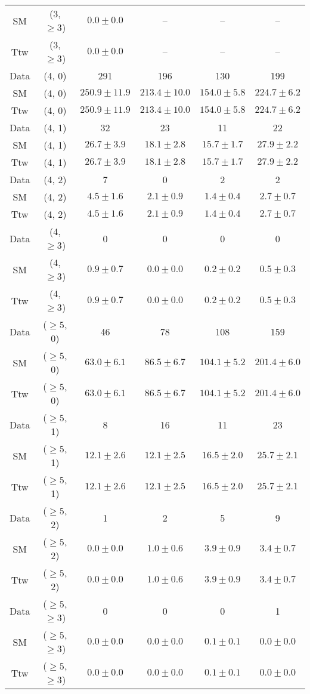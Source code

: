 \begin{table}[h!]
{\begin{tabular}{cccccc}
	SM & (3, $\ge3$) & $0.0\pm 0.0$ & -- & -- & -- \\[0.5ex] 
	Ttw & (3, $\ge3$) & $0.0\pm 0.0$ & -- & -- & -- \\[0.5ex] 
	Data & (4, 0) & 291 & 196 & 130 & 199 \\[0.5ex] 
	SM & (4, 0) & $250.9\pm 11.9$ & $213.4\pm 10.0$ & $154.0\pm 5.8$ & $224.7\pm 6.2$ \\[0.5ex] 
	Ttw & (4, 0) & $250.9\pm 11.9$ & $213.4\pm 10.0$ & $154.0\pm 5.8$ & $224.7\pm 6.2$ \\[0.5ex] 
	Data & (4, 1) & 32 & 23 & 11 & 22 \\[0.5ex] 
	SM & (4, 1) & $26.7\pm 3.9$ & $18.1\pm 2.8$ & $15.7\pm 1.7$ & $27.9\pm 2.2$ \\[0.5ex] 
	Ttw & (4, 1) & $26.7\pm 3.9$ & $18.1\pm 2.8$ & $15.7\pm 1.7$ & $27.9\pm 2.2$ \\[0.5ex] 
	Data & (4, 2) & 7 & 0 & 2 & 2 \\[0.5ex] 
	SM & (4, 2) & $4.5\pm 1.6$ & $2.1\pm 0.9$ & $1.4\pm 0.4$ & $2.7\pm 0.7$ \\[0.5ex] 
	Ttw & (4, 2) & $4.5\pm 1.6$ & $2.1\pm 0.9$ & $1.4\pm 0.4$ & $2.7\pm 0.7$ \\[0.5ex] 
	Data & (4, $\ge3$) & 0 & 0 & 0 & 0 \\[0.5ex] 
	SM & (4, $\ge3$) & $0.9\pm 0.7$ & $0.0\pm 0.0$ & $0.2\pm 0.2$ & $0.5\pm 0.3$ \\[0.5ex] 
	Ttw & (4, $\ge3$) & $0.9\pm 0.7$ & $0.0\pm 0.0$ & $0.2\pm 0.2$ & $0.5\pm 0.3$ \\[0.5ex] 
	Data & ($\ge5$, 0) & 46 & 78 & 108 & 159 \\[0.5ex] 
	SM & ($\ge5$, 0) & $63.0\pm 6.1$ & $86.5\pm 6.7$ & $104.1\pm 5.2$ & $201.4\pm 6.0$ \\[0.5ex] 
	Ttw & ($\ge5$, 0) & $63.0\pm 6.1$ & $86.5\pm 6.7$ & $104.1\pm 5.2$ & $201.4\pm 6.0$ \\[0.5ex] 
	Data & ($\ge5$, 1) & 8 & 16 & 11 & 23 \\[0.5ex] 
	SM & ($\ge5$, 1) & $12.1\pm 2.6$ & $12.1\pm 2.5$ & $16.5\pm 2.0$ & $25.7\pm 2.1$ \\[0.5ex] 
	Ttw & ($\ge5$, 1) & $12.1\pm 2.6$ & $12.1\pm 2.5$ & $16.5\pm 2.0$ & $25.7\pm 2.1$ \\[0.5ex] 
	Data & ($\ge5$, 2) & 1 & 2 & 5 & 9 \\[0.5ex] 
	SM & ($\ge5$, 2) & $0.0\pm 0.0$ & $1.0\pm 0.6$ & $3.9\pm 0.9$ & $3.4\pm 0.7$ \\[0.5ex] 
	Ttw & ($\ge5$, 2) & $0.0\pm 0.0$ & $1.0\pm 0.6$ & $3.9\pm 0.9$ & $3.4\pm 0.7$ \\[0.5ex] 
	Data & ($\ge5$, $\ge3$) & 0 & 0 & 0 & 1 \\[0.5ex] 
	SM & ($\ge5$, $\ge3$) & $0.0\pm 0.0$ & $0.0\pm 0.0$ & $0.1\pm 0.1$ & $0.0\pm 0.0$ \\[0.5ex] 
	Ttw & ($\ge5$, $\ge3$) & $0.0\pm 0.0$ & $0.0\pm 0.0$ & $0.1\pm 0.1$ & $0.0\pm 0.0$ \\[0.5ex] 
	\hline
	\hline
\end{tabular}}
\end{table}
